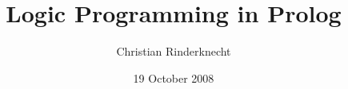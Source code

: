 \documentclass[compress,dvips,xcolor={dvipsnames},t]{beamer}
\title{Logic Programming in Prolog}
\author{Christian Rinderknecht}
\date{19 October 2008}
\begin{document}
\frame{\maketitle}










\end{document}
